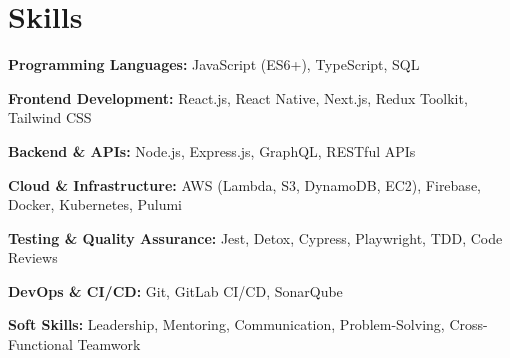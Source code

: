 \section{Skills}
\vspace{2pt}
\resumeSubHeadingListStart
\small{\item{

    \textbf{Programming Languages:}  
    JavaScript (ES6+), TypeScript, SQL \\ \vspace{3pt}

    \textbf{Frontend Development:}  
    React.js, React Native, Next.js, Redux Toolkit, Tailwind CSS \\ \vspace{3pt}

    \textbf{Backend \& APIs:}  
    Node.js, Express.js, GraphQL, RESTful APIs \\ \vspace{3pt}

    \textbf{Cloud \& Infrastructure:}  
    AWS (Lambda, S3, DynamoDB, EC2), Firebase, Docker, Kubernetes, Pulumi \\ \vspace{3pt}

    \textbf{Testing \& Quality Assurance:}  
    Jest, Detox, Cypress, Playwright, TDD, Code Reviews \\ \vspace{3pt}

    \textbf{DevOps \& CI/CD:}  
    Git, GitLab CI/CD, SonarQube \\ \vspace{3pt}

    \textbf{Soft Skills:}  
    Leadership, Mentoring, Communication, Problem-Solving, Cross-Functional Teamwork
}}
\resumeSubHeadingListEnd
